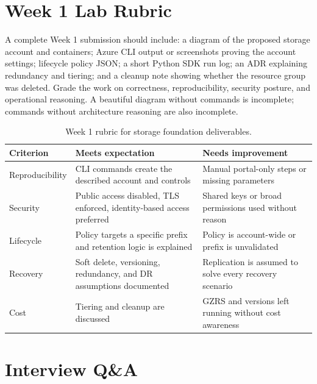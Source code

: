 \section{Week 1 Lab Rubric}
A complete Week 1 submission should include: a diagram of the proposed storage account and containers; Azure CLI output or screenshots proving the account settings; lifecycle policy JSON; a short Python SDK run log; an ADR explaining redundancy and tiering; and a cleanup note showing whether the resource group was deleted. Grade the work on correctness, reproducibility, security posture, and operational reasoning. A beautiful diagram without commands is incomplete; commands without architecture reasoning are also incomplete.

\begin{table}[H]
\centering
\small
\begin{tabular}{@{}p{3.2cm}p{5.0cm}p{5.0cm}@{}}
\toprule
\textbf{Criterion} & \textbf{Meets expectation} & \textbf{Needs improvement} \\
\midrule
Reproducibility & CLI commands create the described account and controls & Manual portal-only steps or missing parameters \\
Security & Public access disabled, TLS enforced, identity-based access preferred & Shared keys or broad permissions used without reason \\
Lifecycle & Policy targets a specific prefix and retention logic is explained & Policy is account-wide or prefix is unvalidated \\
Recovery & Soft delete, versioning, redundancy, and DR assumptions documented & Replication is assumed to solve every recovery scenario \\
Cost & Tiering and cleanup are discussed & GZRS and versions left running without cost awareness \\
\bottomrule
\end{tabular}
\caption{Week 1 rubric for storage foundation deliverables.}
\label{tab:week1-rubric}
\end{table}

\section{Interview Q\&A}
